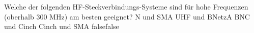     {Welche der folgenden HF-Steckverbindungs-Systeme sind für hohe Frequenzen (oberhalb 300 MHz) am besten geeignet?}
    {N und SMA}
    {UHF und BNetzA}
    {BNC und Cinch}
    {Cinch und SMA}
    {false}{false}